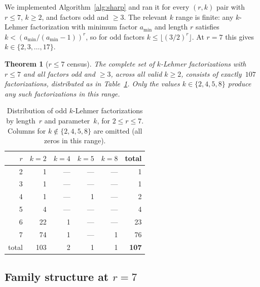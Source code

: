 \documentclass[11pt]{article}
\newtheorem{theorem}{Theorem}
\theoremstyle{definition}
\theoremstyle{remark}
\begin{document}
We implemented Algorithm~\ref{alg:sharp} and ran it for every $(r, k)$
pair with $r \le 7$, $k \ge 2$, and factors odd and $\ge 3$. The
relevant $k$ range is finite: any $k$-Lehmer factorization with
minimum factor $a_{\min}$ and length $r$ satisfies $k < (a_{\min} /
(a_{\min} - 1))^r$, so for odd factors $k \le \lfloor (3/2)^r \rfloor$.
At $r = 7$ this gives $k \in \{2, 3, \ldots, 17\}$.

\begin{theorem}[$r \le 7$ census]\label{thm:census}
The complete set of $k$-Lehmer factorizations with $r \le 7$ and all
factors odd and $\ge 3$, across all valid $k \ge 2$, consists of
exactly~$107$ factorizations, distributed as in
Table~\ref{tab:census}. Only the values $k \in \{2, 4, 5, 8\}$ produce
any such factorizations in this range.
\end{theorem}

\begin{table}[ht]
\centering
\caption{Distribution of odd $k$-Lehmer factorizations by length~$r$
and parameter~$k$, for $2 \le r \le 7$. Columns for $k \notin
\{2,4,5,8\}$ are omitted (all zeros in this range).}\label{tab:census}
\smallskip
\begin{tabular}{@{}rrrrrr@{}}
\toprule
$r$ & $k=2$ & $k=4$ & $k=5$ & $k=8$ & total \\
\midrule
2 & 1   & --- & --- & --- & 1 \\
3 & 1   & --- & --- & --- & 1 \\
4 & 1   & --- & 1   & --- & 2 \\
5 & 4   & --- & --- & --- & 4 \\
6 & 22  & 1   & --- & --- & 23 \\
7 & 74  & 1   & --- & 1   & 76 \\
\midrule
total & 103 & 2 & 1 & 1 & \textbf{107} \\
\bottomrule
\end{tabular}
\end{table}

\subsection{Family structure at $r = 7$}\label{subsec:families}
\end{document}
